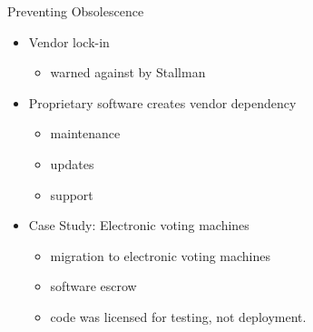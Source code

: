 


\begin{frame}{Preventing Obsolescence}
  \begin{itemize}

    \item Vendor lock-in
      \begin{itemize}
        \item warned against by Stallman~\citeyear[para. 54]{rms2011}
      \end{itemize}
    \item Proprietary software creates vendor dependency
      \begin{itemize}
        \item maintenance
        \item updates
        \item support
      \end{itemize}
    \item Case Study: Electronic voting machines~\cite[p. 916]{colannino}
      \begin{itemize}
        \item migration to electronic voting machines
        \item software escrow
        \item code was licensed for testing, not deployment.
      \end{itemize}
  \end{itemize}
\end{frame}



